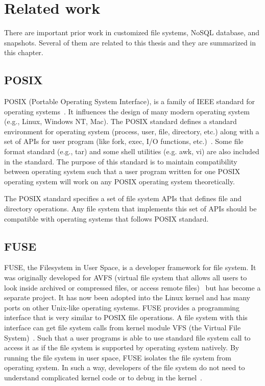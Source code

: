 \chapter{Related work}
\label{chap:related_work}

    There are important prior work in customized file systems, NoSQL database, and snapshots. Several of them are related to this thesis and they are summarized in this chapter.

\section{POSIX}

    POSIX (Portable Operating System Interface), is a family of IEEE standard for operating systems~\cite{posix_wiki}. It influences the design of many modern operating system (e.g., Linux, Windows NT, Mac). The POSIX standard defines a standard environment for operating system (process, user, file, directory, etc.) along with a set of APIs for user program (like fork, exec, I/O functions, etc.)~\cite{posix}. Some file format standard (e.g., tar) and some shell utilities (e.g. awk, vi) are also included in the standard. The purpose of this standard is to maintain compatibility between operating system such that a user program written for one POSIX operating system will work on any POSIX operating system theoretically. 

    The POSIX standard specifies a set of file system APIs that defines file and directory operations. Any file system that implements this set of APIs should be compatible with operating systems that follows POSIX standard.

\section{FUSE}

    FUSE, the Filesystem in User Space, is a developer framework for file system. It was originally developed for AVFS (virtual file system that allows all users
to look inside archived or compressed files, or access remote files)~\cite{avfs} but has become a separate project. It has now been adopted into the Linux kernel and has many ports on other Unix-like operating systems. FUSE provides a programming interface that is very similar to POSIX file operations. A file system with this interface can get file system calls from kernel module VFS (the Virtual File System)~\cite{vfs}. Such that a user programs is able to use standard file system call to access it as if the file system is supported by operating system natively. By running the file system in user space, FUSE isolates the file system from operating system. In such a way, developers of the file system do not need to understand complicated kernel code or to debug in the kernel~\cite{fuse}.

